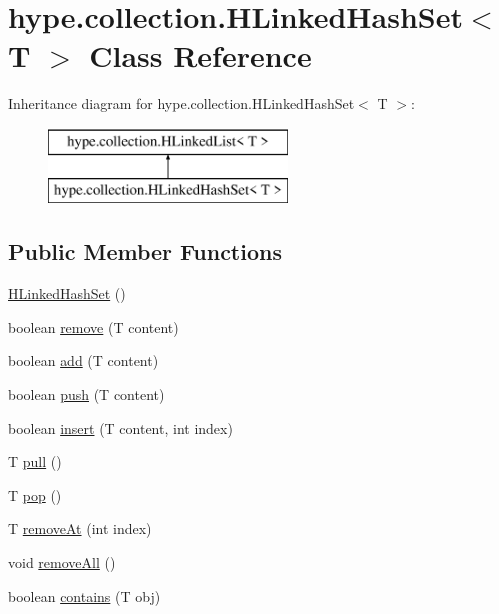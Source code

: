 \hypertarget{classhype_1_1collection_1_1_h_linked_hash_set_3_01_t_01_4}{\section{hype.\-collection.\-H\-Linked\-Hash\-Set$<$ T $>$ Class Reference}
\label{classhype_1_1collection_1_1_h_linked_hash_set_3_01_t_01_4}
}
Inheritance diagram for hype.\-collection.\-H\-Linked\-Hash\-Set$<$ T $>$\-:\begin{figure}[H]
\begin{center}
\leavevmode
\includegraphics[height=2.000000cm]{classhype_1_1collection_1_1_h_linked_hash_set_3_01_t_01_4}
\end{center}
\end{figure}
\subsection*{Public Member Functions}
\begin{DoxyCompactItemize}
\item 
\hyperlink{classhype_1_1collection_1_1_h_linked_hash_set_3_01_t_01_4_a80a0726922266b1d2f336ddef45d48af}{H\-Linked\-Hash\-Set} ()
\item 
boolean \hyperlink{classhype_1_1collection_1_1_h_linked_hash_set_3_01_t_01_4_a1ad10cacbf30beccd66d3a5399a120c0}{remove} (T content)
\item 
boolean \hyperlink{classhype_1_1collection_1_1_h_linked_hash_set_3_01_t_01_4_a817ff2180174a0953756e2bf7c82aa65}{add} (T content)
\item 
boolean \hyperlink{classhype_1_1collection_1_1_h_linked_hash_set_3_01_t_01_4_ad9f9c3ea984e88e5d9579e84e07df27d}{push} (T content)
\item 
boolean \hyperlink{classhype_1_1collection_1_1_h_linked_hash_set_3_01_t_01_4_a618fcaef21334f722c620978d4e898ea}{insert} (T content, int index)
\item 
T \hyperlink{classhype_1_1collection_1_1_h_linked_hash_set_3_01_t_01_4_a19a210f3c2cc0df11431d506ab215544}{pull} ()
\item 
T \hyperlink{classhype_1_1collection_1_1_h_linked_hash_set_3_01_t_01_4_a577833c02b8b875ed84d4df3d8a395c4}{pop} ()
\item 
T \hyperlink{classhype_1_1collection_1_1_h_linked_hash_set_3_01_t_01_4_a51eb13bff6a30dd73beef4f8c3356696}{remove\-At} (int index)
\item 
void \hyperlink{classhype_1_1collection_1_1_h_linked_hash_set_3_01_t_01_4_a50e3ea3477deffafbdbff2656436a1f4}{remove\-All} ()
\item 
boolean \hyperlink{classhype_1_1collection_1_1_h_linked_hash_set_3_01_t_01_4_aed5013d0f73fe3aa1211f709a42abf25}{contains} (T obj)
\end{DoxyCompactItemize}
